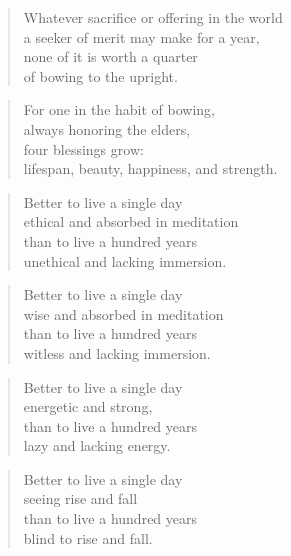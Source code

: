 \documentclass[12pt,openany]{book}%
\begin{document}
\begin{verse}%
Whatever sacrifice or offering in the world \\
a seeker of merit may make for a year, \\
none of it is worth a quarter \\
of bowing to the upright. 

%
\end{verse}

\begin{verse}%
For one in the habit of bowing, \\
always honoring the elders, \\
four blessings grow: \\
lifespan, beauty, happiness, and strength. 

%
\end{verse}

\begin{verse}%
Better to live a single day \\
ethical and absorbed in meditation \\
than to live a hundred years \\
unethical and lacking immersion. 

%
\end{verse}

\begin{verse}%
Better to live a single day \\
wise and absorbed in meditation \\
than to live a hundred years \\
witless and lacking immersion. 

%
\end{verse}

\begin{verse}%
Better to live a single day \\
energetic and strong, \\
than to live a hundred years \\
lazy and lacking energy. 

%
\end{verse}

\begin{verse}%
Better to live a single day \\
seeing rise and fall \\
than to live a hundred years \\
blind to rise and fall. 

%
\end{verse}
\end{document}

